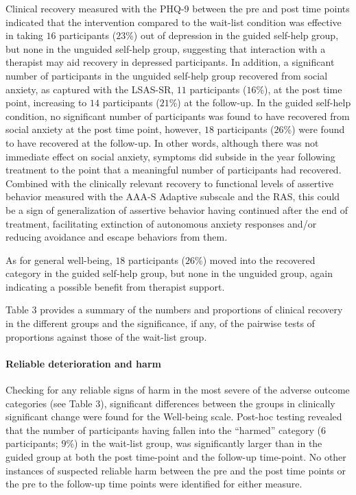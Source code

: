 \documentclass[3p]{elsarticle} %
\begin{document}
Clinical recovery measured with the PHQ-9 between the pre and post time
points indicated that the intervention compared to the wait-list
condition was effective in taking \(16\) participants (\(23\)\%) out of
depression in the guided self-help group, but none in the unguided
self-help group, suggesting that interaction with a therapist may aid
recovery in depressed participants. In addition, a significant number of
participants in the unguided self-help group recovered from social
anxiety, as captured with the LSAS-SR, \(11\) participants (\(16\)\%),
at the post time point, increasing to \(14\) participants (\(21\)\%) at
the follow-up. In the guided self-help condition, no significant number
of participants was found to have recovered from social anxiety at the
post time point, however, \(18\) participants (\(26\)\%) were found to
have recovered at the follow-up. In other words, although there was not
immediate effect on social anxiety, symptoms did subside in the year
following treatment to the point that a meaningful number of
participants had recovered. Combined with the clinically relevant
recovery to functional levels of assertive behavior measured with the
AAA-S Adaptive subscale and the RAS, this could be a sign of
generalization of assertive behavior having continued after the end of
treatment, facilitating extinction of autonomous anxiety responses
and/or reducing avoidance and escape behaviors from them.

As for general well-being, \(18\) participants (\(26\)\%) moved into the
recovered category in the guided self-help group, but none in the
unguided group, again indicating a possible benefit from therapist
support.

Table 3 provides a summary of the numbers and proportions of clinical
recovery in the different groups and the significance, if any, of the
pairwise tests of proportions against those of the wait-list group.

\hypertarget{reliable-deterioration-and-harm}{%
\paragraph{Reliable deterioration and
harm}\label{reliable-deterioration-and-harm}}

Checking for any reliable signs of harm in the most severe of the
adverse outcome categories (see Table 3), significant differences
between the groups in clinically significant change were found for the
Well-being scale. Post-hoc testing revealed that the number of
participants having fallen into the ``harmed'' category (\(6\)
participants; \(9\)\%) in the wait-list group, was significantly larger
than in the guided group at both the post time-point and the follow-up
time-point. No other instances of suspected reliable harm between the
pre and the post time points or the pre to the follow-up time points
were identified for either measure.
\end{document}

